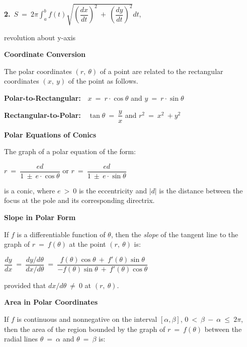 \documentclass{article}
\begin{document}
\begin{large}
\hspace{0.2in} \textbf{2.}\ $S\ =\ 2\pi\displaystyle\int^{b}_{a}f(t)\sqrt{\left(\dfrac{dx}{dt}\right)^{2}\ +\ \left(\dfrac{dy}{dt}\right)^{2}}dt$, \begin{Large} revolution about y-axis \end{Large}

\textbf{Coordinate Conversion}

\hspace{0.1in} The polar coordinates $(r,\ \theta)$ of a point are related to the rectangular coordinates $(x,\ y)$ of the point as follows.

\hspace{0.2in} \textbf{Polar-to-Rectangular:}\ \ $x\ =\ r\cdot\cos \theta$ and $y\ =\ r\cdot\sin \theta$

\hspace{0.2in} \textbf{Rectangular-to-Polar:}\ \ $\tan \theta\ =\ \dfrac{y}{x}$ and $r^{2}\ =\ x^{2}\ + y^{2}$

\vspace{1.5in}
\textbf{Polar Equations of Conics}

\hspace{0.1in} The graph of a polar equation of the form:

\hspace{1.5in} $r\ =\ \dfrac{ed}{1\ \pm\ e\cdot\cos \theta}$ or $r\ =\ \dfrac{ed}{1\ \pm\ e\cdot\sin \theta}$

\hspace{0.1in} is a conic, where $e\ >\ 0$ is the eccentricity and $|d|$ is the distance between the focus at the pole and its corresponding directrix.

\textbf{Slope in Polar Form}

\hspace{0.1in} If $f$ is a differentiable function of $\theta$, then the \textit{slope} of the tangent line to the graph of $r\ =\ f(\theta)$ at the point $(r,\ \theta)$ is:

\hspace{1.5in} $\dfrac{dy}{dx}\ =\ \dfrac{dy/d\theta}{dx/d\theta}\ =\ \dfrac{f(\theta)\cos \theta\ +\ f'(\theta)\sin \theta}{-f(\theta)\sin \theta\ +\ f'(\theta)\cos \theta}$

\hspace{0.1in} provided that $dx/d\theta\ \neq\ 0$ at $(r,\ \theta)$.

\textbf{Area in Polar Coordinates}

\hspace{0.1in} If $f$ is continuous and nonnegative on the interval $[\alpha, \beta]$, $0\ <\ \beta\ -\ \alpha\ \leq\ 2\pi$, then the area of the region bounded by the graph of $r\ =\ f(\theta)$ between the radial lines $\theta\ =\ \alpha$ and $\theta\ =\ \beta$ is:


\end{large}
\end{document}
